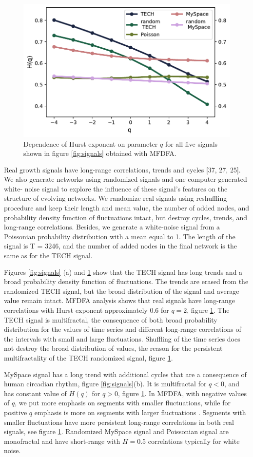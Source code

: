 \begin{figure}[!ht]
	\centering
	\includegraphics[width=0.6\linewidth]{Figures/hurst.pdf}
	\caption{Dependence of Hurst exponent on parameter $q$ for all five signals shown in figure \ref{fig:signals} obtained with MFDFA. }
	\label{fig:mfdfa}
\end{figure}
Real growth signals have long-range correlations, trends and cycles [37, 27, 25]. We
also generate networks using randomized signals and one computer-generated white-
noise signal to explore the influence of these signal’s features on the structure of
evolving networks. We randomize real signals using reshuffling procedure and keep their
length and mean value, the number of added nodes, and probability density function
of fluctuations intact, but destroy cycles, trends, and long-range correlations. Besides,
we generate a white-noise signal from a Poissonian probability distribution with a mean
equal to 1. The length of the signal is T = 3246, and the number of added nodes in the
final network is the same as for the TECH signal.

Figures \ref{fig:signals} (a) and \ref{fig:mfdfa} show that the TECH signal has long trends and a broad probability density function of fluctuations. The trends are erased from the randomized TECH signal, but the broad distribution of the signal and average value remain intact. MFDFA analysis shows that real signals have long-range correlations with Hurst exponent approximately $0.6$ for $q=2$, figure \ref{fig:mfdfa}. The TECH signal is multifractal, the consequence of both broad probability distribution for the values of time series and different long-range correlations of the intervals with small and large fluctuations. Shuffling of the time series does not destroy the broad distribution of values, the reason for the persistent multifractality of the TECH randomized signal, figure \ref{fig:mfdfa}.

MySpace signal has a long trend with additional cycles that are a consequence of human circadian rhythm, figure \ref{fig:signals}(b). It is multifractal for $q<0$, and has constant value of $H(q)$ for $q>0$, figure \ref{fig:mfdfa}. In MFDFA, with negative values of $q$, we put more emphasis on segments with smaller fluctuations, while for positive $q$ emphasis is more on segments with larger fluctuations \cite{ihlen2012}. Segments with smaller fluctuations have more persistent long-range correlations in both real signals, see figure \ref{fig:mfdfa}. Randomized MySpace signal and Poissonian signal are monofractal and have short-range with $H=0.5$ correlations typically for white noise.    


